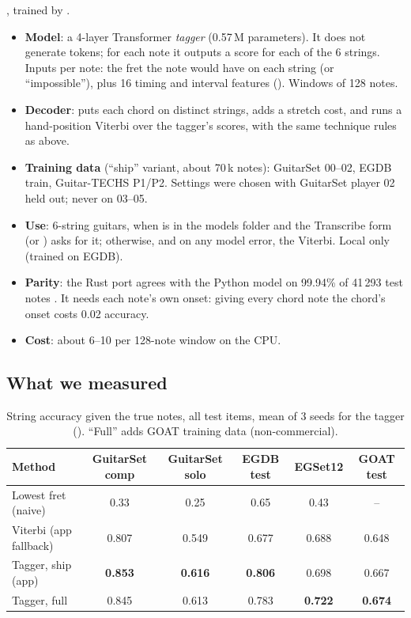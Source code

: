 \begin{inapp}
\label{sec:fingering-app}
, trained by .
\begin{itemize}
\item \textbf{Model}: a 4-layer Transformer \emph{tagger} (0.57\,M parameters).
  It does not generate tokens; for each note it outputs a score for each of
  the 6 strings. Inputs per note: the fret the note would have on each string
  (or ``impossible''), plus 16 timing and interval features ().
  Windows of 128 notes.
\item \textbf{Decoder}: puts each chord on distinct strings, adds a stretch
  cost, and runs a hand-position Viterbi over the tagger's scores, with the
  same technique rules as above.
\item \textbf{Training data} (``ship'' variant, about 70\,k notes): GuitarSet
  00--02, EGDB train, Guitar-TECHS P1/P2. Settings were chosen with GuitarSet
  player 02 held out; never on 03--05.
\item \textbf{Use}: 6-string guitars, when  is in the
  models folder and the Transcribe form (or ) asks for
  it; otherwise, and on any model error, the Viterbi. Local only (trained on
  EGDB).
\item \textbf{Parity}: the Rust port agrees with the Python model on 99.94\% of
  41\,293 test notes \measured. It needs each note's own onset: giving every
  chord note the chord's onset costs 0.02 accuracy.
\item \textbf{Cost}: about 6--10\ms{} per 128-note window on the CPU.
\end{itemize}
\end{inapp}

\subsection{What we measured}

\begin{table}[h]
\centering
\caption{String accuracy given the true notes, all test items, mean of 3 seeds
for the tagger \measured{} (). ``Full'' adds GOAT
training data (non-commercial).}
\label{tab:fingering}
\small
\begin{tabular}{@{}lccccc@{}}
\toprule
Method & GuitarSet comp & GuitarSet solo & EGDB test & EGSet12 & GOAT test \\
\midrule
Lowest fret (naive) & 0.33 & 0.25 & 0.65 & 0.43 & -- \\
Viterbi (app fallback) & 0.807 & 0.549 & 0.677 & 0.688 & 0.648 \\
Tagger, ship (app) & \textbf{0.853} & \textbf{0.616} & \textbf{0.806} & 0.698 & 0.667 \\
Tagger, full & 0.845 & 0.613 & 0.783 & \textbf{0.722} & \textbf{0.674} \\
\bottomrule
\end{tabular}
\end{table}

